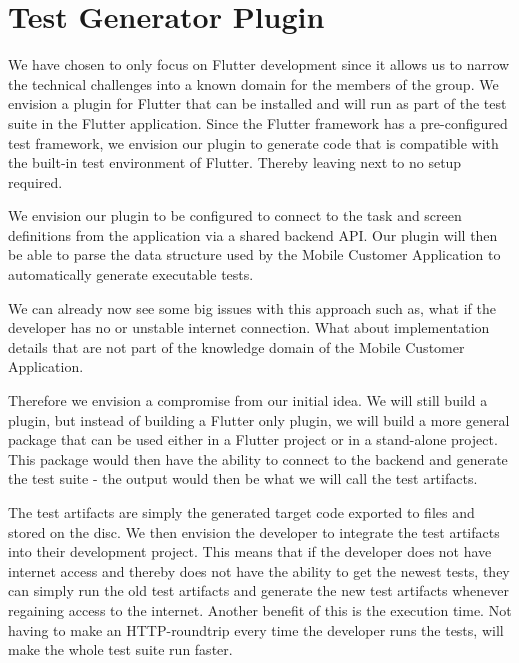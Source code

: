 \section{Test Generator Plugin}
We have chosen to only focus on Flutter development since it allows us to narrow the technical challenges into a known domain for the members of the group.
We envision a plugin for Flutter that can be installed and will run as part of the test suite in the Flutter application.
Since the Flutter framework has a pre-configured test framework, we envision our plugin to generate code that is compatible with the built-in test environment of Flutter.
Thereby leaving next to no setup required.

We envision our plugin to be configured to connect to the task and screen definitions from the application via a shared backend API.
Our plugin will then be able to parse the data structure used by the Mobile Customer Application to automatically generate executable tests.

We can already now see some big issues with this approach such as, what if the developer has no or unstable internet connection.
What about implementation details that are not part of the knowledge domain of the Mobile Customer Application.

Therefore we envision a compromise from our initial idea. 
We will still build a plugin, but instead of building a Flutter only plugin, we will build a more general package that can be used either in a Flutter project or in a stand-alone project. 
This package would then have the ability to connect to the backend and generate the test suite - the output would then be what we will call the test artifacts.

The test artifacts are simply the generated target code exported to files and stored on the disc. We then envision the developer to integrate the test artifacts into their development project. 
This means that if the developer does not have internet access and thereby does not have the ability to get the newest tests, they can simply run the old test artifacts and generate the new test artifacts whenever regaining access to the internet. Another benefit of this is the execution time. 
Not having to make an HTTP-roundtrip every time the developer runs the tests, will make the whole test suite run faster.

